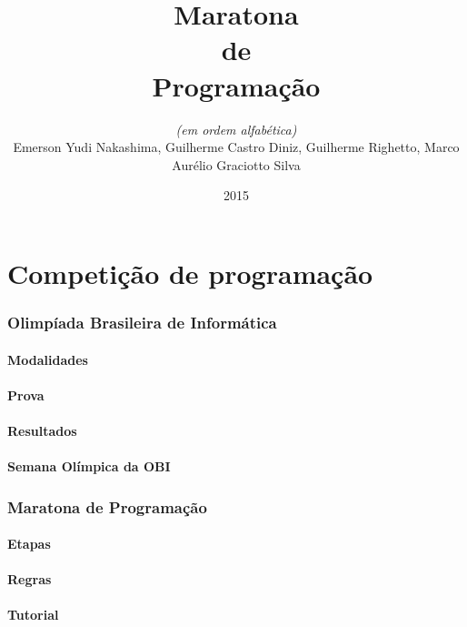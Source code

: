 \documentclass[utf8, usepdftitle=false, svgnames, color={table, fixpdftex, hyperref, fixinclude, xcdraw}, t, brazil]{beamer}
\title{Maratona\\de\\Programação}
\author[UTFPR-CM]{\textit{(em ordem alfabética)}\\Emerson Yudi Nakashima, Guilherme Castro Diniz, Guilherme Righetto, Marco Aurélio Graciotto Silva}
\date[]{2015}
\begin{document}
	\frontmatter{}
	

	\part{Competição de programação}

		\section[OBI]{Olimpíada Brasileira de Informática}
		

			\subsection{Modalidades}
			

			\subsection{Prova}
			

			\subsection{Resultados}
			

			\subsection{Semana Olímpica da OBI}
			



		\section[ICPC]{Maratona de Programação}
		

			\subsection{Etapas}
			

			\subsection{Regras}
			

			\subsection{Tutorial}
			
\end{document}
